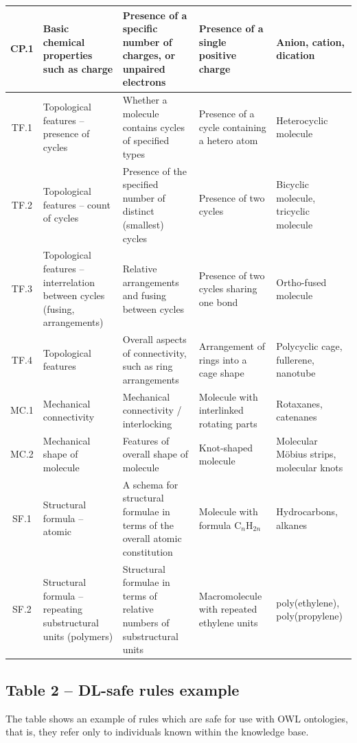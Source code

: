 \documentclass[10pt]{bmc_article}
\newenvironment{bmcformat}{\baselineskip20pt\sloppy\setboolean{publ}{false}}{\baselineskip20pt\sloppy}
\begin{document}
\begin{bmcformat}
{\begin{tabular}{|c|p{3cm}|p{4cm}|p{3cm}|p{3cm}|}
        CP.1 & Basic chemical properties such as charge &  Presence of a specific number of charges, or unpaired electrons & Presence of a single positive charge & Anion, cation, dication \\ \hline
        TF.1 & Topological features -- presence of cycles & Whether a molecule contains cycles of specified types & Presence of a cycle containing a hetero atom & Heterocyclic molecule \\ \hline
        TF.2 & Topological features -- count of cycles  & Presence of the specified number of distinct (smallest) cycles & Presence of two cycles & Bicyclic molecule, tricyclic molecule \\ \hline
        TF.3 & Topological features -- interrelation between cycles (fusing, arrangements)  & Relative arrangements and fusing between cycles  & Presence of two cycles sharing one bond & Ortho-fused molecule \\ \hline
        TF.4 & Topological features & Overall aspects of connectivity, such as ring arrangements & Arrangement of rings into a cage shape & Polycyclic cage, fullerene, nanotube \\ \hline
        MC.1 & Mechanical connectivity & Mechanical connectivity / interlocking &  Molecule with interlinked rotating parts & Rotaxanes, catenanes \\ \hline
        MC.2 & Mechanical shape of molecule & Features of overall shape of molecule & Knot-shaped molecule & Molecular M\"{o}bius strips, molecular knots  \\ \hline
        SF.1 & Structural formula -- atomic & A schema for structural formulae in terms of the overall atomic constitution & Molecule with formula C$_n$H$_{2n}$  & Hydrocarbons, alkanes \\ \hline
        SF.2 & Structural formula -- repeating substructural units (polymers) & Structural formulae in terms of relative numbers of substructural units & Macromolecule with repeated ethylene units & poly(ethylene), poly(propylene) \\ \hline
      \end{tabular}
      } 


\subsection*{Table 2 -- DL-safe rules example}
\label{tab:DL-safe-example}
The table shows an example of rules which are safe for use with OWL ontologies, that is, they refer only to individuals known within the knowledge base. 


\end{bmcformat}
\end{document}

